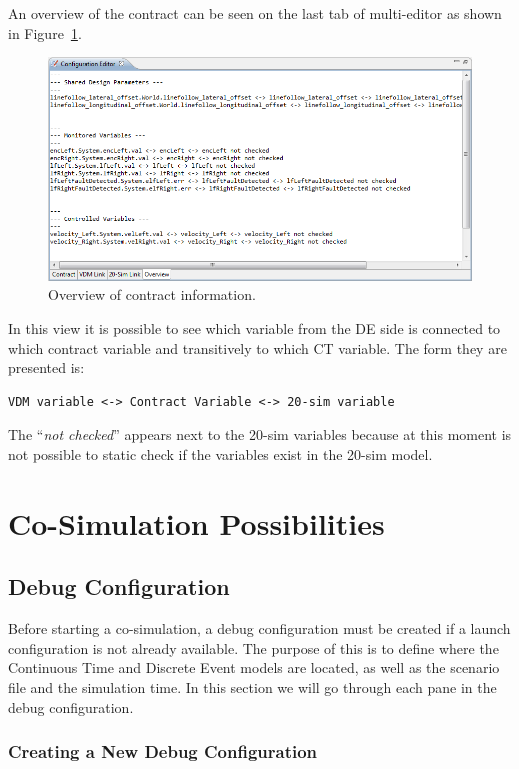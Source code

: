 \documentclass{crescendorepchap}
\begin{document}
An overview of the contract can be seen on the last tab of multi-editor as shown in Figure~\ref{fig:ContractOverview}.

\begin{figure}[htbp]
\centering
\includegraphics[width=.8\textwidth]{images/ContractOverview.png}
\caption{Overview of contract information.\label{fig:ContractOverview}}
\end{figure}

In this view it is possible to see which variable from the DE side is
connected to which contract variable and transitively to which CT
variable. The form they are presented is:

\begin{verbatim}
VDM variable <-> Contract Variable <-> 20-sim variable
\end{verbatim}

The ``\emph{not checked}'' appears next to the 20-sim variables because at
this moment is not possible to static check if the variables exist in
the 20-sim model.


\chapter{Co-Simulation Possibilities}\label{chap:cosim}

\section{Debug Configuration}\label{sec:DebugConfigIntro}

Before starting a co-simulation, a debug configuration must be created
if a launch configuration is not already available.
The purpose of this is to define where the Continuous Time and Discrete
Event models are located, as well as the scenario file and the
simulation time. In this section we will go through each pane in the debug configuration.

\subsection{Creating a New Debug Configuration}
\end{document}
